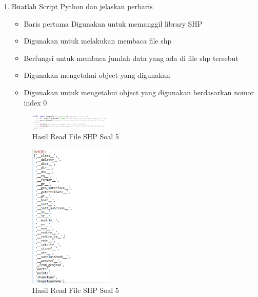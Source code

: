 \begin{enumerate}
    \item Buatlah Script Python dan jelaskan perbaris
    
    \hfill\break
     \begin{itemize}
        \item Baris pertama Digunakan untuk memanggil library SHP
        \item Digunakan untuk melakukan membaca file shp
        \item Berfungsi untuk membaca jumlah data yang ada di file shp tersebut
        \item Digunakan mengetahui object yang digunakan
        \item Digunakan untuk mengetahui object yang digunakan berdasarkan nomor index 0
    \end{itemize}
    \hfill\break
    \begin{figure}[H]
		\includegraphics[width=4cm]{figures/1174021/3/soal5_1.PNG}
		\centering
		\caption{Hasil Read File SHP Soal 5}
    \end{figure}
    \hfill\break
    \begin{figure}[H]
		\includegraphics[width=4cm]{figures/1174021/3/soal5_2.PNG}
		\centering
		\caption{Hasil Read File SHP Soal 5}
    \end{figure}
    

\end{enumerate}

